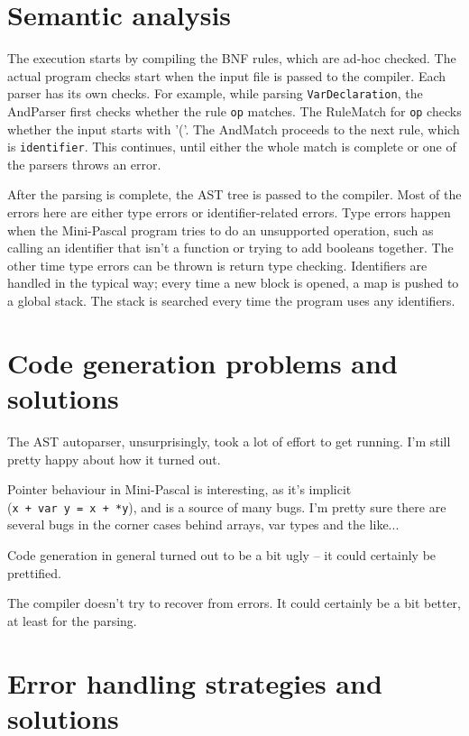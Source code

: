 \documentclass{article}
\begin{document}
\FloatBarrier

\newpage
\section{Semantic analysis}
The execution starts by compiling the BNF rules, which are ad-hoc checked.
The actual program checks start when the input file is passed to the compiler.
Each parser has its own checks. For example, while parsing
\texttt{VarDeclaration}, the AndParser first checks whether the rule \texttt{op}
matches. The RuleMatch for \texttt{op} checks whether the input starts with
'('. The AndMatch proceeds to the next rule, which is \texttt{identifier}. This
continues, until either the whole match is complete or one of the parsers
throws an error.

After the parsing is complete, the AST tree is passed to the compiler. Most of
the errors here are either type errors or identifier-related errors. Type errors
happen when the Mini-Pascal program tries to do an unsupported operation, such
as calling an identifier that isn't a function or trying to add booleans
together. The other time type errors can be thrown is return type checking.
Identifiers are handled in the typical way; every time a new block is opened, a
map is pushed to a global stack. The stack is searched every time the program
uses any identifiers.

\section{Code generation problems and solutions}
The AST autoparser, unsurprisingly, took a lot of effort to get running. I'm
still pretty happy about how it turned out.

Pointer behaviour in Mini-Pascal is interesting, as it's implicit
(\texttt{x~+~var~y~=~x~+~*y}), and is a source of many bugs. I'm pretty sure
there are several bugs in the corner cases behind arrays, var types and the
like...

Code generation in general turned out to be a bit ugly -- it could certainly
be prettified.

The compiler doesn't try to recover from errors. It could certainly be a bit
better, at least for the parsing.

\section{Error handling strategies and solutions}
\end{document}
